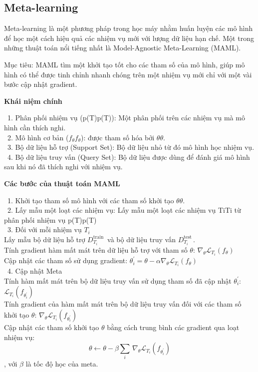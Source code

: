 \subsection{Meta-learning}
Meta-learning là một phương pháp trong học máy nhằm huấn luyện các mô hình để học một cách hiệu quả các nhiệm vụ mới với lượng dữ liệu hạn chế. Một trong những thuật toán nổi tiếng nhất là Model-Agnostic Meta-Learning (MAML).
\par
Mục tiêu: MAML tìm một khởi tạo tốt cho các tham số của mô hình, giúp mô hình có thể được tinh chỉnh nhanh chóng trên một nhiệm vụ mới chỉ với một vài bước cập nhật gradient.
\par
\textbf{Khái niệm chính}
\par
    \indent\textbullet\ 1.	Phân phối nhiệm vụ (p(T)p(T)): Một phân phối trên các nhiệm vụ mà mô hình cần thích nghi.\\
    \indent\textbullet\ 2.	Mô hình cơ bản (\(f_\theta f_\theta\)): được tham số hóa bởi \(\theta \theta\).\\
    \indent\textbullet\ 3.	Bộ dữ liệu hỗ trợ (Support Set): Bộ dữ liệu nhỏ từ đó mô hình học nhiệm vụ.\\
    \indent\textbullet\ 4.	Bộ dữ liệu truy vấn (Query Set): Bộ dữ liệu được dùng để đánh giá mô hình sau khi nó đã thích nghi với nhiệm vụ.\\
\par
\textbf{Các bước của thuật toán MAML}
\par
    \indent\textbullet\ 1.	Khởi tạo tham số mô hình với các tham số khởi tạo \(\theta \theta\).\\
    \indent\textbullet\ 2.	Lấy mẫu một loạt các nhiệm vụ: Lấy mẫu một loạt các nhiệm vụ {Ti}{Ti} từ phân phối nhiệm vụ p(T)p(T)\\
    \indent\textbullet\ 3. Đối với mỗi nhiệm vụ \(T_i\)\\
    	Lấy mẫu bộ dữ liệu hỗ trợ \(D_{T_i}^{\mathrm{train\ }}\) và bộ dữ liệu truy vấn \(D_{T_i}^{\mathrm{test\ }}\).\\
     	Tính gradient hàm mất mát trên dữ liệu hỗ trợ với tham số \(\theta\): \(\nabla_\theta\mathcal{L}_{T_i}\left(f_\theta\right)\) \\
            Cập nhật các tham số sử dụng gradient: \(\theta_i^\prime=\theta-\alpha\nabla_\theta\mathcal{L}_{T_i}\left(f_\theta\right)\) \\
    \indent\textbullet\ 4. Cập nhật Meta\\
        Tính hàm mất mát trên bộ dữ liệu truy vấn sử dụng tham số đã cập nhật \(\theta_i^\prime\): \(\mathcal{L}_{T_i}\left(f_{\theta_i^\prime}\right)\)\\
        Tính gradient của hàm mất mát trên bộ dữ liệu truy vấn đối với các tham số khởi tạo \(\theta\): \(\nabla_\theta\mathcal{L}_{T_i}\left(f_{\theta_i^\prime}\right)\) \\
        Cập nhật các tham số khởi tạo \(\theta\) bằng cách trung bình các gradient qua loạt nhiệm vụ: \\
        \[\theta \gets \theta - \beta \sum_{i} \, \nabla_{\theta} \mathcal{L}_{T_{i}} \left( f_{\theta_{i}^{\prime}} \right)\]
        , với \(\beta\) là tốc độ học của meta.

